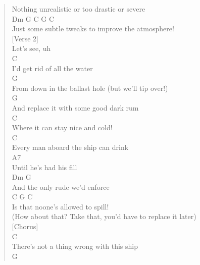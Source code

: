 \documentclass[11pt]{article}
\begin{document}
\begin{verse}
Nothing unrealistic or too drastic or severe\\
\hspace*{1em}Dm                G             C         G       C\\
Just some subtle tweaks to improve the atmosphere!\\
\vspace*{1em}
\vspace*{1em}
[Verse 2]\\
\vspace*{1em}
Let's see, uh\\
\hspace*{9em}C\\
I'd get rid of all the water\\
\hspace*{10em}G\\
From down in the ballast hole (but we'll tip over!)\\
\hspace*{7em}G\\
And replace it with some good dark rum\\
\hspace*{6em}C\\
Where it can stay nice and cold!\\
\hspace*{7em}C\\
Every man aboard the ship can drink\\
\hspace*{3em}A7\\
Until he's had his fill\\
\hspace*{5em}Dm              G\\
And the only rude we'd enforce\\
\hspace*{11em}C       G          C\\
Is that noone's allowed to spill!\\
\vspace*{1em}
(How about that? Take that, you'd have to replace it later)\\
\vspace*{1em}
\vspace*{1em}
[Chorus]\\
\vspace*{1em}
\hspace*{1em}C\\
There's not a thing wrong with this ship\\
\hspace*{1em}G\\

\end{verse}
\end{document}

